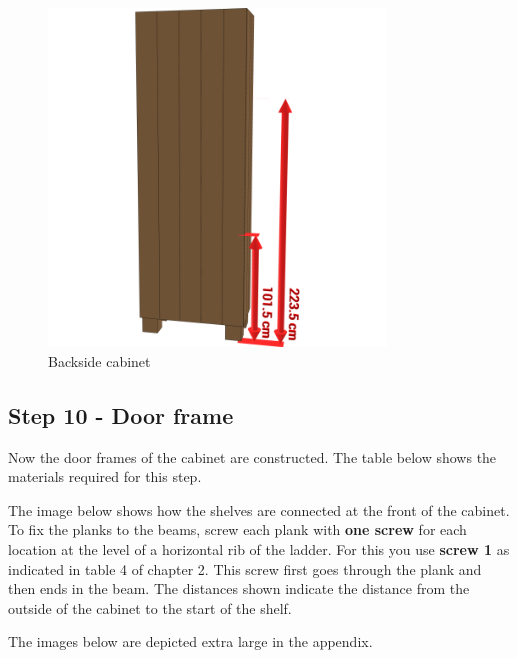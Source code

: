 \documentclass{article}
\begin{document}
\begin{figure}[h!]
    \centering
    \includegraphics[width=0.8\textwidth]{scene 9 - achterkant.png}
    \caption{Backside cabinet}
    \label{fig:stap 9}
\end{figure}

\clearpage
\newpage

\subsection{Step 10 - Door frame}

Now the door frames of the cabinet are constructed. The table below shows the materials required for this step.



The image below shows how the shelves are connected at the front of the cabinet. To fix the planks to the beams, screw each plank with \textbf{one screw} for each location at the level of a horizontal rib of the ladder. For this you use \textbf{screw 1} as indicated in table 4 of chapter 2. This screw first goes through the plank and then ends in the beam. The distances shown indicate the distance from the outside of the cabinet to the start of the shelf.

The images below are depicted extra large in the appendix.
\end{document}
